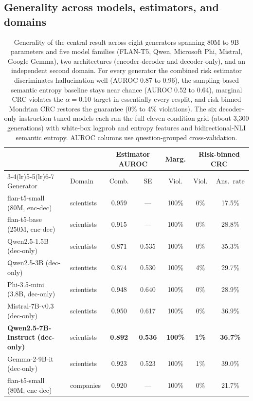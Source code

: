 \documentclass[sn-basic]{sn-jnl}
\theoremstyle{thmstyleone}
\theoremstyle{thmstyletwo}
\begin{document}
\subsection{Generality across models, estimators, and domains}
\label{sec:generality}

\begin{table}[tbp]
\centering\small
\caption{Generality of the central result across eight generators
spanning 80M to 9B parameters and five model families (FLAN-T5, Qwen,
Microsoft Phi, Mistral, Google Gemma), two architectures
(encoder-decoder and decoder-only), and an independent second domain.
For every generator the combined risk estimator discriminates
hallucination well (AUROC 0.87 to 0.96), the sampling-based semantic
entropy baseline stays near chance (AUROC 0.52 to 0.64), marginal CRC
violates the $\alpha = 0.10$ target in essentially every resplit, and
risk-binned Mondrian CRC restores the guarantee (0\% to 4\%
violations). The six decoder-only instruction-tuned models each ran the
full eleven-condition grid (about 3{,}300 generations) with white-box
logprob and entropy features and bidirectional-NLI semantic entropy.
AUROC columns use question-grouped cross-validation.}
\label{tab:generality}
\begin{tabular}{llccccc}
\toprule
& & \multicolumn{2}{c}{Estimator AUROC} &
\multicolumn{1}{c}{Marg.} & \multicolumn{2}{c}{Risk-binned CRC} \\
\cmidrule(lr){3-4}\cmidrule(lr){5-5}\cmidrule(lr){6-7}
Generator & Domain & Comb. & SE & Viol. & Viol. & Ans.\ rate \\
\midrule
flan-t5-small (80M, enc-dec)    & scientists & 0.959 & ---   & 100\% & 0\% & 17.5\% \\
flan-t5-base (250M, enc-dec)    & scientists & 0.915 & ---   & 100\% & 0\% & 28.8\% \\
Qwen2.5-1.5B (dec-only)         & scientists & 0.871 & 0.535 & 100\% & 0\% & 35.3\% \\
Qwen2.5-3B (dec-only)           & scientists & 0.874 & 0.530 & 100\% & 4\% & 29.7\% \\
Phi-3.5-mini (3.8B, dec-only)   & scientists & 0.948 & 0.640 & 100\% & 0\% & 28.9\% \\
Mistral-7B-v0.3 (dec-only)      & scientists & 0.950 & 0.617 & 100\% & 0\% & 36.9\% \\
\textbf{Qwen2.5-7B-Instruct (dec-only)} & scientists & \textbf{0.892} & \textbf{0.536} & \textbf{100\%} & \textbf{1\%} & \textbf{36.7\%} \\
Gemma-2-9B-it (dec-only)        & scientists & 0.923 & 0.523 & 100\% & 1\% & 39.0\% \\
flan-t5-small (80M, enc-dec)    & companies  & 0.920 & ---   & 100\% & 0\% & 21.7\% \\
\bottomrule
\end{tabular}
\end{table}
\end{document}
